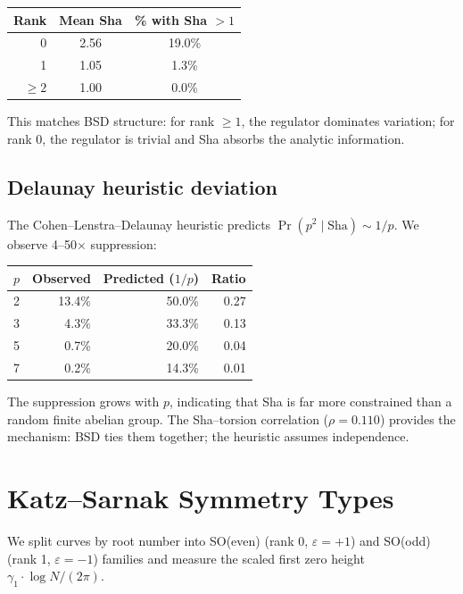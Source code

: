 \documentclass[11pt,a4paper]{article}
\begin{document}
\begin{center}
\begin{tabular}{rcc}
\toprule
\textbf{Rank} & \textbf{Mean Sha} & \textbf{\% with Sha $> 1$} \\
\midrule
0 & 2.56 & 19.0\% \\
1 & 1.05 & 1.3\% \\
$\geq 2$ & 1.00 & 0.0\% \\
\bottomrule
\end{tabular}
\end{center}

This matches BSD structure: for rank ${\geq} 1$, the regulator dominates variation; for rank 0, the regulator is trivial and Sha absorbs the analytic information.

\subsection{Delaunay heuristic deviation}

The Cohen--Lenstra--Delaunay heuristic predicts $\Pr(p^2 \mid \text{Sha}) \sim 1/p$. We observe 4--50$\times$ suppression:

\begin{center}
\begin{tabular}{rrrr}
\toprule
$p$ & \textbf{Observed} & \textbf{Predicted ($1/p$)} & \textbf{Ratio} \\
\midrule
2 & 13.4\% & 50.0\% & 0.27 \\
3 & 4.3\% & 33.3\% & 0.13 \\
5 & 0.7\% & 20.0\% & 0.04 \\
7 & 0.2\% & 14.3\% & 0.01 \\
\bottomrule
\end{tabular}
\end{center}

The suppression grows with $p$, indicating that Sha is far more constrained than a random finite abelian group. The Sha--torsion correlation ($\rho = 0.110$) provides the mechanism: BSD ties them together; the heuristic assumes independence.

\section{Katz--Sarnak Symmetry Types}
\label{sec:katz_sarnak}

We split curves by root number into SO(even) (rank 0, $\varepsilon = +1$) and SO(odd) (rank 1, $\varepsilon = -1$) families and measure the scaled first zero height $\gamma_1 \cdot \log N / (2\pi)$.
\end{document}
